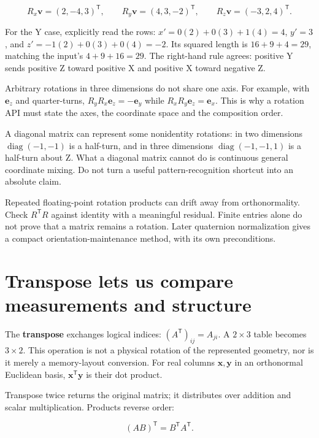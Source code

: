 \[
R_x\mathbf v=(2,-4,3)^{\mathsf T},\qquad
R_y\mathbf v=(4,3,-2)^{\mathsf T},\qquad
R_z\mathbf v=(-3,2,4)^{\mathsf T}.
\]

For the Y case, explicitly read the rows: \(x'=0(2)+0(3)+1(4)=4\), \(y'=3\), and \(z'=-1(2)+0(3)+0(4)=-2\). Its squared length is \(16+9+4=29\), matching the input's \(4+9+16=29\). The right-hand rule agrees: positive Y sends positive Z toward positive X and positive X toward negative Z.

Arbitrary rotations in three dimensions do not share one axis. For example, with \(\mathbf e_z\) and quarter-turns, \(R_yR_x\mathbf e_z=-\mathbf e_y\) while \(R_xR_y\mathbf e_z=\mathbf e_x\). This is why a rotation API must state the axes, the coordinate space and the composition order.

A diagonal matrix can represent some nonidentity rotations: in two dimensions \(\operatorname{diag}(-1,-1)\) is a half-turn, and in three dimensions \(\operatorname{diag}(-1,-1,1)\) is a half-turn about Z. What a diagonal matrix cannot do is continuous general coordinate mixing. Do not turn a useful pattern-recognition shortcut into an absolute claim.

Repeated floating-point rotation products can drift away from orthonormality. Check \(R^{\mathsf T}R\) against identity with a meaningful residual. Finite entries alone do not prove that a matrix remains a rotation. Later quaternion normalization gives a compact orientation-maintenance method, with its own preconditions.

\section{Transpose lets us compare measurements and structure}\label{01-foundations-i-ch018-transpose-lets-us-compare-measurements-and-structure}

The \textbf{transpose} exchanges logical indices: \((A^{\mathsf T})_{ij}=A_{ji}\). A \(2\times3\) table becomes \(3\times2\). This operation is not a physical rotation of the represented geometry, nor is it merely a memory-layout conversion. For real columns \(\mathbf x,\mathbf y\) in an orthonormal Euclidean basis, \(\mathbf x^{\mathsf T}\mathbf y\) is their dot product.

Transpose twice returns the original matrix; it distributes over addition and scalar multiplication. Products reverse order:

\[
(AB)^{\mathsf T}=B^{\mathsf T}A^{\mathsf T}.
\]

